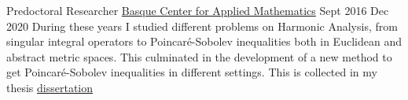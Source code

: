 \begin{firstemployment}
    {Predoctoral Researcher}
    { \href{http://www.bcamath.org/es/}{Basque Center for Applied Mathematics}}
    {Sept 2016}
    {Dec 2020}
    {During these years I studied different problems on Harmonic Analysis, from singular integral operators to Poincaré-Sobolev inequalities both in Euclidean and abstract metric spaces. This culminated in the development of a new method to get Poincaré-Sobolev inequalities in different settings. This is collected in my thesis \href{https://bird.bcamath.org/handle/20.500.11824/1206}{dissertation}}
\end{firstemployment}